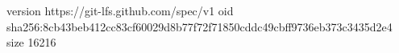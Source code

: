 version https://git-lfs.github.com/spec/v1
oid sha256:8cb43beb412cc83cf60029d8b77f72f71850cddc49cbff9736eb373c3435d2e4
size 16216
